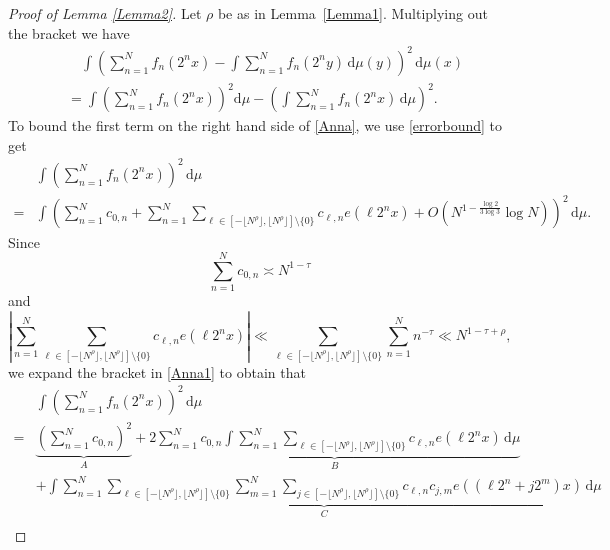 \documentclass[amssymb,amsfonts,refcheck,12pt,verbatim,righttag]{amsart}
\numberwithin{equation}{section} %
\theoremstyle{plain}
\begin{document}
\begin{proof}[Proof of Lemma \ref{Lemma2}]
	Let $\rho$ be as in Lemma~\ref{Lemma1}. Multiplying out the bracket we have 
    \begin{equation}\label{Anna}
    \begin{aligned} 
		&\quad\int \left(\sum_{n=1}^{N}f_{n}(2^nx)-\int \sum_{n=1}^{N}f_{n}(2^ny)\,\mathrm{d} \mu(y) \right)^2\,\mathrm{d}\mu(x) \\
        &=\int\left( \sum_{n=1}^{N}f_{n}(2^nx)\right)^2 \mathrm{d}\mu-\left( \int \sum_{n=1}^{N}f_{n}(2^nx)\, \mathrm{d}\mu\right)^2.
	\end{aligned}
     \end{equation}
	To bound the first term on the right hand side of \eqref{Anna}, we use \eqref{errorbound} to get
	\begin{align}
		\label{Anna1}
		&\int \left( \sum_{n=1}^{N}f_{n}(2^nx)\right)^2\, \mathrm{d}\mu\nonumber \\
		=&\int \left(\sum_{n=1}^{N}c_{0,n}+\sum_{n=1}^{N}\sum_{\ell\in [-\lfloor N^{ \rho}\rfloor,\lfloor N^{ \rho}\rfloor]\setminus \{0\}}c_{\ell,n}e(\ell 2^nx)+O\left(N^{1-\frac{\log2}{3\log3}}\log N\right)\right)^{2}\, \mathrm{d}\mu.
	\end{align} 
Since
	\begin{equation}
		\label{trivial1}
		\sum_{n=1}^{N}c_{0,n}\asymp N^{1-\tau}
	\end{equation}
	and
	\begin{equation*}
\left|\sum_{n=1}^{N}\sum_{\ell\in [-\lfloor N^{\rho}\rfloor,\lfloor N^{ \rho}\rfloor]\setminus \{0\}}c_{\ell,n}e(\ell 2^nx)\right|\ll \sum_{\ell\in [-\lfloor N^{\rho}\rfloor,\lfloor N^{ \rho}\rfloor]\setminus \{0\}}\sum_{n=1}^{N}n^{-\tau}\ll N^{1- \tau+\rho},
	\end{equation*}
we expand the bracket in \eqref{Anna1} to obtain that
	\begin{align*}
		&\int \left( \sum_{n=1}^{N}f_{n}(2^nx)\right)^2\, \mathrm{d}\mu\\
		=&\underbrace{\left(\sum_{n=1}^{N}c_{0,n}\right)^{2}}_{A}+\underbrace{2\sum_{n=1}^{N}c_{0,n}\int \sum_{n=1}^{N}\sum_{\ell\in [-\lfloor N^{\rho}\rfloor,\lfloor N^{ \rho}\rfloor]\setminus \{0\}}c_{\ell,n}e(\ell 2^nx)\, \mathrm{d}\mu}_{B}\\
		&+\underbrace{\int \sum_{n=1}^{N}\sum_{\ell \in [-\lfloor N^{ \rho}\rfloor,\lfloor N^{ \rho}\rfloor]\setminus\{0\}}\sum_{m=1}^{N}\sum_{j\in [-\lfloor N^{\rho}\rfloor,\lfloor N^{ \rho}\rfloor]\setminus\{0\}}c_{\ell,n}c_{j,m}e((\ell 2^n+j2^m)x)\, \mathrm{d}\mu}_{C}\\

\end{align*}
\end{proof}
\end{document}
